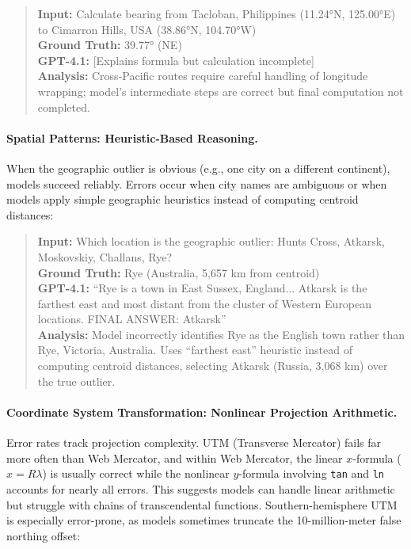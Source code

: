 \begin{quote}
\small
\textbf{Input:} Calculate bearing from Tacloban, Philippines (11.24°N, 125.00°E) to Cimarron Hills, USA (38.86°N, 104.70°W)\\
\textbf{Ground Truth:} 39.77° (NE)\\
\textbf{GPT-4.1:} [Explains formula but calculation incomplete]\\
\textbf{Analysis:} Cross-Pacific routes require careful handling of longitude wrapping; model's intermediate steps are correct but final computation not completed.
\end{quote}

\paragraph{Spatial Patterns: Heuristic-Based Reasoning.}
When the geographic outlier is obvious (e.g., one city on a different continent), models succeed reliably. Errors occur when city names are ambiguous or when models apply simple geographic heuristics instead of computing centroid distances:

\begin{quote}
\small
\textbf{Input:} Which location is the geographic outlier: Hunts Cross, Atkarsk, Moskovskiy, Challans, Rye?\\
\textbf{Ground Truth:} Rye (Australia, 5,657 km from centroid)\\
\textbf{GPT-4.1:} ``Rye is a town in East Sussex, England... Atkarsk is the farthest east and most distant from the cluster of Western European locations. FINAL ANSWER: Atkarsk''\\
\textbf{Analysis:} Model incorrectly identifies Rye as the English town rather than Rye, Victoria, Australia. Uses ``farthest east'' heuristic instead of computing centroid distances, selecting Atkarsk (Russia, 3,068 km) over the true outlier.
\end{quote}

\paragraph{Coordinate System Transformation: Nonlinear Projection Arithmetic.}
Error rates track projection complexity. UTM (Transverse Mercator) fails far more often than Web Mercator, and within Web Mercator, the linear $x$-formula ($x = R\lambda$) is usually correct while the nonlinear $y$-formula involving \texttt{tan} and \texttt{ln} accounts for nearly all errors. This suggests models can handle linear arithmetic but struggle with chains of transcendental functions. Southern-hemisphere UTM is especially error-prone, as models sometimes truncate the 10-million-meter false northing offset:

